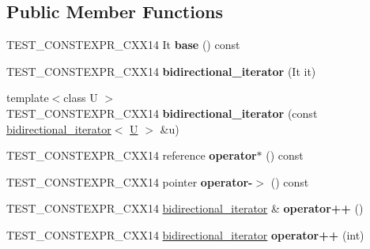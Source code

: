 \subsection*{Public Member Functions}
\begin{DoxyCompactItemize}
\item 
\mbox{\label{classbidirectional__iterator_af54990491f0a8257684933018769580f}} 
T\+E\+S\+T\+\_\+\+C\+O\+N\+S\+T\+E\+X\+P\+R\+\_\+\+C\+X\+X14 It {\bfseries base} () const
\item 
\mbox{\label{classbidirectional__iterator_a33ec52a487d3261e00873c139f6643ec}} 
T\+E\+S\+T\+\_\+\+C\+O\+N\+S\+T\+E\+X\+P\+R\+\_\+\+C\+X\+X14 {\bfseries bidirectional\+\_\+iterator} (It it)
\item 
\mbox{\label{classbidirectional__iterator_a928eea374f78f31bd8c27d55b5e3b252}} 
{\footnotesize template$<$class U $>$ }\\T\+E\+S\+T\+\_\+\+C\+O\+N\+S\+T\+E\+X\+P\+R\+\_\+\+C\+X\+X14 {\bfseries bidirectional\+\_\+iterator} (const \mbox{\hyperlink{classbidirectional__iterator}{bidirectional\+\_\+iterator}}$<$ \mbox{\hyperlink{union_u}{U}} $>$ \&u)
\item 
\mbox{\label{classbidirectional__iterator_a0dfea4a442990550b996d494bfd39555}} 
T\+E\+S\+T\+\_\+\+C\+O\+N\+S\+T\+E\+X\+P\+R\+\_\+\+C\+X\+X14 reference {\bfseries operator$\ast$} () const
\item 
\mbox{\label{classbidirectional__iterator_a2bf95cc83437fa24ba190e79ba0fcfe7}} 
T\+E\+S\+T\+\_\+\+C\+O\+N\+S\+T\+E\+X\+P\+R\+\_\+\+C\+X\+X14 pointer {\bfseries operator-\/$>$} () const
\item 
\mbox{\label{classbidirectional__iterator_a01b7e74ef064bc8636ca36855e7881a7}} 
T\+E\+S\+T\+\_\+\+C\+O\+N\+S\+T\+E\+X\+P\+R\+\_\+\+C\+X\+X14 \mbox{\hyperlink{classbidirectional__iterator}{bidirectional\+\_\+iterator}} \& {\bfseries operator++} ()
\item 
\mbox{\label{classbidirectional__iterator_aacb6a8e3469e0598dce03eeeac797f26}} 
T\+E\+S\+T\+\_\+\+C\+O\+N\+S\+T\+E\+X\+P\+R\+\_\+\+C\+X\+X14 \mbox{\hyperlink{classbidirectional__iterator}{bidirectional\+\_\+iterator}} {\bfseries operator++} (int)

\end{DoxyCompactItemize}
